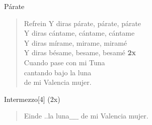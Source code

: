 \begin{song}{Párate}
\begin{verse}{Refrein}
 \hspace{1em} Y diras párate, párate, párate\\
 \hspace{1em} Y diras cántame, cántame, cántame\\
 \hspace{1em} Y diras mírame, mirame, miramé\\
 \hspace{1em} Y diras bésame, besame, besamé \hspace{1em} \textbf{2x}\\
Cuando pase con mi Tuna\\
cantando bajo \chord{(*)} la luna\\
de mi Valencia mujer.
\end{verse}

\begin{instrumental}{Intermezzo}[4]
  \measure{} \measure{}
    (2x)
\end{instrumental}


\begin{verse}{Einde}
\chord{(*)}..la luna$\_\_\_$$\_$ de mi Valencia mujer.  \hspace{0.8em} \hspace{1.3em} 
\end{verse}
\end{song}

